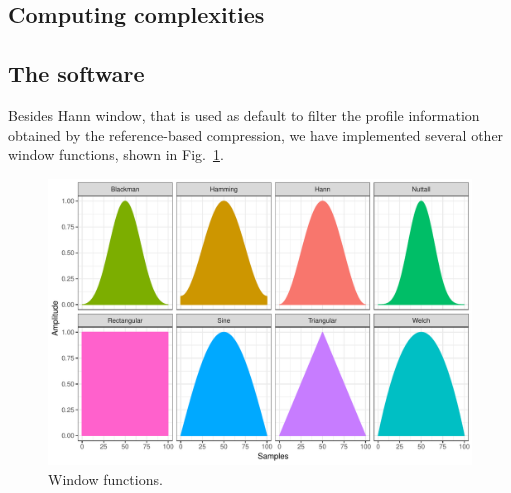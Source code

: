 \subsection{Computing complexities}

\subsection{The software}

Besides Hann window, that is used as default to filter the profile information obtained by the reference-based compression, we have implemented several other window functions, shown in Fig.~\ref{fig.filters}.
\begin{figure}[!h]
  \centering
\includegraphics[width=.95\linewidth]{filters.pdf}
\caption{Window functions.}
\label{fig.filters}
\end{figure}
